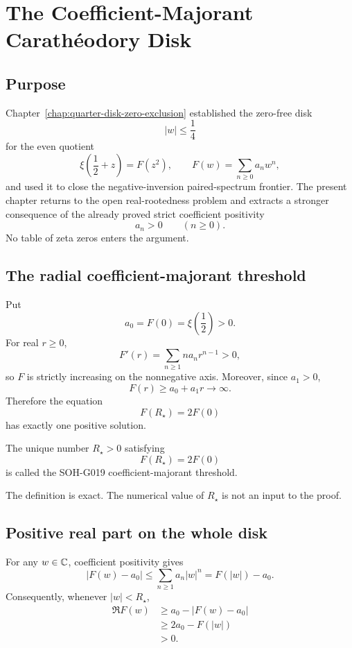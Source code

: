 \chapter{The Coefficient-Majorant Carath\'eodory Disk}
\label{chap:coefficient-majorant-caratheodory-disk}


\section{Purpose}

Chapter~\ref{chap:quarter-disk-zero-exclusion} established the zero-free disk
\[
 |w|\le \frac14
\]
for the even quotient
\[
 \xi\!\left(\frac12+z\right)=F(z^2),
 \qquad
 F(w)=\sum_{n\ge0}a_nw^n,
\]
and used it to close the negative-inversion paired-spectrum frontier. The present chapter returns to the open real-rootedness problem and extracts a stronger consequence of the already proved strict coefficient positivity
\[
 a_n>0\qquad(n\ge0).
\]
No table of zeta zeros enters the argument.

\section{The radial coefficient-majorant threshold}

Put
\[
 a_0=F(0)=\xi\!\left(\frac12\right)>0.
\]
For real $r\ge0$,
\[
 F'(r)=\sum_{n\ge1}na_nr^{n-1}>0,
\]
so $F$ is strictly increasing on the nonnegative axis. Moreover, since $a_1>0$,
\[
 F(r)\ge a_0+a_1r\longrightarrow\infty.
\]
Therefore the equation
\[
 F(R_\star)=2F(0)
\]
has exactly one positive solution.

\begin{definition}
The unique number $R_\star>0$ satisfying
\[
 \boxed{F(R_\star)=2F(0)}
\]
is called the SOH-G019 coefficient-majorant threshold.
\end{definition}

The definition is exact. The numerical value of $R_\star$ is not an input to the proof.

\section{Positive real part on the whole disk}

For any $w\in\mathbb{C}$, coefficient positivity gives
\[
 \left|F(w)-a_0\right|
 \le \sum_{n\ge1}a_n|w|^n
 =F(|w|)-a_0.
\]
Consequently, whenever $|w|<R_\star$,
\begin{align*}
 \Re F(w)
 &\ge a_0-\left|F(w)-a_0\right|\\
 &\ge 2a_0-F(|w|)\\
 &>0.
\end{align*}

